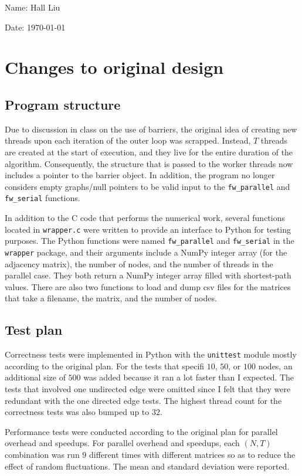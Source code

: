 \documentclass{article}
\begin{document}
Name: Hall Liu

Date: \today 
\vspace{20pt}

\section*{Changes to original design}
\subsection*{Program structure}
Due to discussion in class on the use of barriers, the original idea of creating new threads upon each iteration of the outer loop was scrapped. Instead, $T$ threads are created at the start of execution, and they live for the entire duration of the algorithm. Consequently, the structure that is passed to the worker threads now includes a pointer to the barrier object. In addition, the program no longer considers empty graphs/null pointers to be valid input to the \verb|fw_parallel| and \verb|fw_serial| functions.

In addition to the C code that performs the numerical work, several functions located in \verb|wrapper.c| were written to provide an interface to Python for testing purposes. The Python functions were named \verb|fw_parallel| and \verb|fw_serial| in the \verb|wrapper| package, and their arguments include a NumPy integer array (for the adjacency matrix), the number of nodes, and the number of threads in the parallel case. They both return a NumPy integer array filled with shortest-path values. There are also two functions to load and dump csv files for the matrices that take a filename, the matrix, and the number of nodes.
\subsection*{Test plan}
Correctness tests were implemented in Python with the \verb|unittest| module mostly according to the original plan. For the tests that specifi $10$, $50$, or $100$ nodes, an additional size of $500$ was added because it ran a lot faster than I expected. The tests that involved one undirected edge were omitted since I felt that they were redundant with the one directed edge tests. The highest thread count for the correctness tests was also bumped up to $32$. 

Performance tests were conducted according to the original plan for parallel overhead and speedups. For parallel overhead and speedups, each $(N,T)$ combination was run $9$ different times with different matrices so as to reduce the effect of random fluctuations. The mean and standard deviation were reported. 
\end{document}
